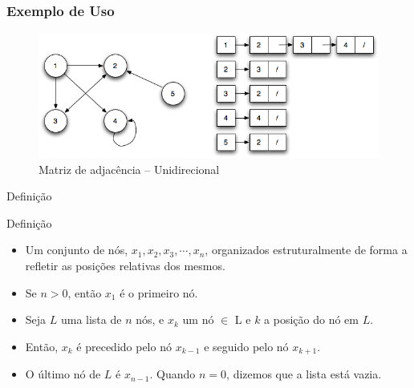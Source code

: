 \begin{frame}
\frametitle{Exemplo de Uso}
\begin{figure}[!hb]
	\centering
		\includegraphics[height=0.30\paperheight, width=0.55\paperwidth]{figs/fig_listas/lista_matriz_adj02}			
			\caption{Matriz de adjacência -- Unidirecional}	
			\end{figure} 


  \end{frame}



\begin{frame}{Definição}
     \begin{block}{Definição}
     \begin{itemize}
       \item Um conjunto de nós, $x_1, x_2, x_3, \cdots, x_n$, organizados estruturalmente de forma a refletir as posições relativas dos mesmos. 
       \item  Se $n > 0$, então $x_1$ é o primeiro nó.
      \item Seja $L$ uma lista de $n$ nós, e $x_k$ um nó $\in$ L e $k$ a posição do nó em $L$. 
      \item  Então, $x_k$ é precedido pelo nó $x_{k-1}$ e seguido pelo nó $x_{k+1}$. 
      \item  O último nó de $L$ é $x_{n-1}$. Quando $n = 0$, dizemos que a lista está vazia.
       \end{itemize}
     \end{block}     
\end{frame}



